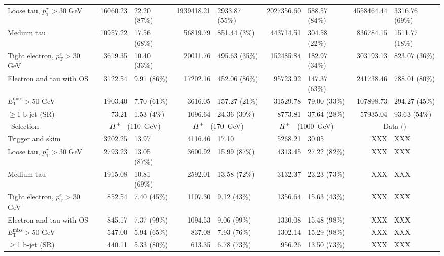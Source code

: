 \begin{table}[!thp]
\begin{center}
{\begin{tabular}{|l|r@{ $\pm$ }l|r@{ $\pm$ }l|r@{ $\pm$ }l|r@{ $\pm$ }l|}
			Loose tau, $p_\mathrm{T}^{\tau}>30$ GeV   & 16060.23 & 22.20 (87\%) & 1939418.21 & 2933.87 (55\%) & 2027356.60 & 588.57 (84\%) & 4558464.44 & 3316.76 (69\%) \\
			Medium tau                    & 10957.22 & 17.56 (68\%) & 56819.79 & 851.44 (3\%) & 443714.51 & 304.58 (22\%) & 836784.15 & 1511.77 (18\%) \\
			Tight electron, $p_\mathrm{T}^{e}>30$ GeV           & 3619.35 & 10.40 (33\%) & 20011.76 & 495.63 (35\%) & 152485.84 & 182.97 (34\%) & 303193.13 & 823.07 (36\%) \\
			Electron and tau with OS                         & 3122.54 & 9.91 (86\%) & 17202.16 & 452.06 (86\%) & 95723.92 & 147.37 (63\%) & 241738.46 & 788.01 (80\%) \\
			$E_\mathrm{T}^\mathrm{miss}>50$ GeV\       & 1903.40 & 7.70 (61\%) & 3616.05 & 157.27 (21\%) & 31529.78 & 79.00 (33\%) & 107898.73 & 294.27 (45\%) \\
			$\ge$1 b-jet (SR)                          & 73.21 & 1.53 (4\%) &  1096.64 & 24.36 (30\%) & 8773.81 & 37.64 (28\%) & 57935.04 & 93.63 (54\%) \\
			\hline\
			Selection                                        & \multicolumn{2}{c|}{$H^{\pm}$ $\phantom{0}$(110~GeV)} & \multicolumn{2}{c|}{$H^{\pm}$ $\phantom{0}$(170~GeV)} & \multicolumn{2}{c|}{$H^{\pm}$ $\phantom{0}$(1000~GeV)} & \multicolumn{2}{c|}{Data (\LUMI )}  \\ 
			\hline
			Trigger and skim                            & 3202.25 & 13.97 & 4116.46 & 17.10 & 5268.21 & 30.05 & XXX & XXX \\
			Loose tau, $p_\mathrm{T}^{\tau}>30$ GeV & 2793.23 & 13.05 (87\%) & 3600.92 & 15.99 (87\%) & 4313.45 & 27.22 (82\%) & XXX & XXX \\
			Medium tau   & 1915.08 & 10.81 (69\%) & 2592.01 & 13.58 (72\%) & 3132.37 & 23.23 (73\%) & XXX & XXX \\
			Tight electron, $p_\mathrm{T}^{e}>30$ GeV\  & 852.54 & 7.40 (45\%) & 1107.30 & 9.12 (43\%) & 1356.64 & 15.63 (43\%) & XXX & XXX \\
			Electron and tau with OS                    & 845.17 & 7.37 (99\%) & 1094.53 & 9.06 (99\%) & 1330.08 & 15.48 (98\%) & XXX & XXX  \\
			$E_\mathrm{T}^\mathrm{miss}>50$ GeV\          & 547.00 & 5.94 (65\%) & 837.08 & 7.93 (76\%) & 1302.14 & 15.29 (98\%) & XXX & XXX \\
			$\ge$1 b-jet (SR)                            & 440.11 & 5.33 (80\%) & 613.35 & 6.78 (73\%) & 956.26 & 13.50 (73\%) & XXX & XXX \\
			\hline
			\end{tabular}}
			\end{center}
		\end{table}

